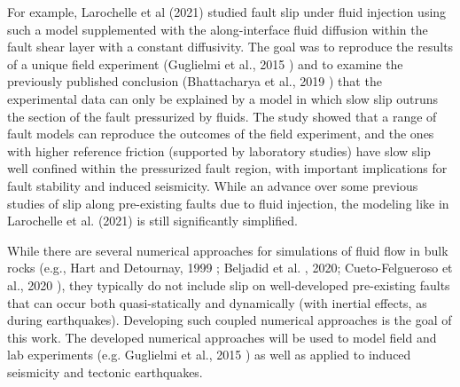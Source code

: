 For example, Larochelle et al (2021) \cite{Larochelle_2021} studied fault slip under fluid injection using such a model supplemented with the along-interface fluid diffusion within the fault shear layer with a constant diffusivity.  The goal was to reproduce the results of a unique field experiment (Guglielmi et al., 2015 \cite{guglielmi_seismicity_2015}) and to examine the previously published conclusion (Bhattacharya et al., 2019 \cite{bhattacharya_induced_2019}) that the experimental data can only be explained by a model in which slow slip outruns the section of the fault pressurized by fluids.  
The study showed that a range of fault models can reproduce the outcomes of the field experiment, and the ones with higher reference friction (supported by laboratory studies) have slow slip well confined within the pressurized fault region, with important implications for fault stability and induced seismicity.   
While an advance over some previous studies of slip along pre-existing faults due to fluid injection, the modeling like in Larochelle et al. (2021) \cite{Larochelle_2021} is still significantly simplified. 


While there are several numerical approaches for simulations of fluid flow in bulk rocks (e.g., Hart and Detournay, 1999 \cite{detournay_flac_1999}; Beljadid et al. \cite{Beljadid2020}, 2020; Cueto-Felgueroso et al., 2020 \cite{CuetoFelgueroso2020}), they typically do not include slip on well-developed pre-existing faults that can occur both quasi-statically and dynamically (with inertial effects, as during earthquakes). Developing such coupled numerical approaches is the goal of this work. The developed numerical approaches will be used to model field and lab experiments (e.g. Guglielmi et al., 2015 \cite{guglielmi_seismicity_2015}) as well as applied to induced seismicity and tectonic earthquakes. 